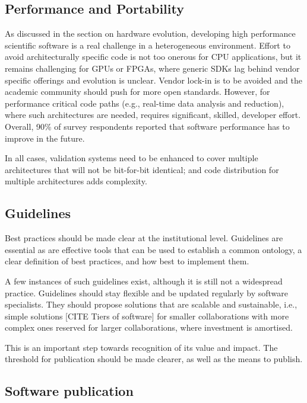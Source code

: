 \subsection{Performance and Portability}

As discussed in the section on hardware evolution, developing high performance scientific software is a real challenge in a heterogeneous environment. Effort to avoid architecturally specific code is not too onerous for CPU applications, but it remains challenging for GPUs or FPGAs, where generic SDKs lag behind vendor specific offerings and evolution is unclear. Vendor lock-in is to be avoided and the academic community should push for more open standards. However, for performance critical code paths (e.g., real-time data analysis and reduction), where such architectures are needed, requires significant, skilled, developer effort. Overall, 90\% of survey respondents reported that software performance has to improve in the future.

In all cases, validation systems need to be enhanced to cover multiple architectures that will not be bit-for-bit identical; and code distribution for multiple architectures adds complexity.

\subsection{Guidelines}

Best practices should be made clear at the institutional level. Guidelines are essential as are effective tools that can be used to establish a common ontology, a clear definition of best practices, and how best to implement them. 

A few instances of such guidelines exist, although it is still not a widespread practice. Guidelines should stay flexible and be updated regularly by software specialists. They should propose solutions that are scalable and sustainable, i.e., simple solutions [CITE Tiers of software] for smaller collaborations with more complex ones reserved for larger collaborations, where investment is amortised.

This is an important step towards recognition of its value and impact. The threshold for publication should be made clearer, as well as the means to publish.


\subsection{Software publication}

